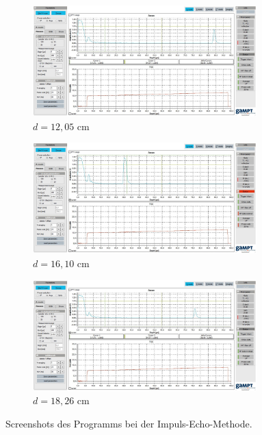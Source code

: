 \begin{figure}
  \centering
  \begin{subfigure}{0.7\textwidth}
    \centering
    \includegraphics[width=0.95\textwidth]{screens/1205.jpg}
    \caption{$d = 12,05$ cm}
    \label{fig:180-deg}
  \end{subfigure}

  \begin{subfigure}{0.7\textwidth}
    \centering
    \includegraphics[width=0.95\textwidth]{screens/1610.jpg}
    \caption{$d = 16,10$ cm}
    \label{fig:270-deg}
  \end{subfigure}

  \begin{subfigure}{0.7\textwidth}
    \centering
    \includegraphics[width=0.95\textwidth]{screens/1826.jpg}
    \caption{$d = 18,26$ cm}
    \label{fig:270-adeg}
  \end{subfigure}
  \caption{Screenshots des Programms bei der Impuls-Echo-Methode.}
  \label{fig: graphen}
\end{figure}



